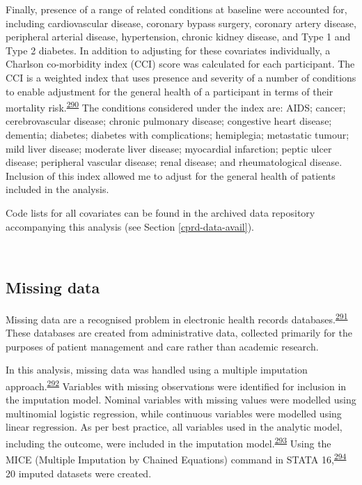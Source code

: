 \documentclass[a4paper, twoside]{templates/ociamthesis}
\begin{document}
Finally, presence of a range of related conditions at baseline were accounted for, including cardiovascular disease, coronary bypass surgery, coronary artery disease, peripheral arterial disease, hypertension, chronic kidney disease, and Type 1 and Type 2 diabetes. In addition to adjusting for these covariates individually, a Charlson co-morbidity index (CCI) score was calculated for each participant. The CCI is a weighted index that uses presence and severity of a number of conditions to enable adjustment for the general health of a participant in terms of their mortality risk.\textsuperscript{\protect\hyperlink{ref-charlson1987new}{290}} The conditions considered under the index are: AIDS; cancer; cerebrovascular disease; chronic pulmonary disease; congestive heart disease; dementia; diabetes; diabetes with complications; hemiplegia; metastatic tumour; mild liver disease; moderate liver disease; myocardial infarction; peptic ulcer disease; peripheral vascular disease; renal disease; and rheumatological disease. Inclusion of this index allowed me to adjust for the general health of patients included in the analysis.

Code lists for all covariates can be found in the archived data repository accompanying this analysis (see Section \ref{cprd-data-avail}).

~

\hypertarget{missing-data}{%
\subsection{Missing data}\label{missing-data}}

Missing data are a recognised problem in electronic health records databases.\textsuperscript{\protect\hyperlink{ref-wells2013strategies}{291}} These databases are created from administrative data, collected primarily for the purposes of patient management and care rather than academic research.

In this analysis, missing data was handled using a multiple imputation approach.\textsuperscript{\protect\hyperlink{ref-sterne2009}{292}} Variables with missing observations were identified for inclusion in the imputation model. Nominal variables with missing values were modelled using multinomial logistic regression, while continuous variables were modelled using linear regression. As per best practice, all variables used in the analytic model, including the outcome, were included in the imputation model.\textsuperscript{\protect\hyperlink{ref-moons2006}{293}} Using the MICE (Multiple Imputation by Chained Equations) command in STATA 16,\textsuperscript{\protect\hyperlink{ref-statacorp2019}{294}} 20 imputed datasets were created.
\end{document}
